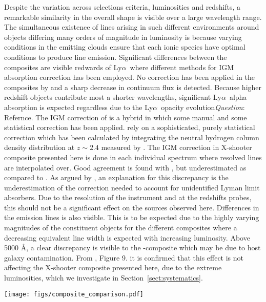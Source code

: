 \documentclass{aa}    %
\newcommand{\figlabel}[1]{\label{fig:#1}}
\newcommand{\sectionname}{Section}
\newcommand{\Sect}[1]{\sectionname~\ref{sect:#1}}
\newcommand{\sect}[1]{\Sect{#1}}
\newcommand{\lya}{Ly$\alpha$}
\newcommand{\todo}[3]{{\color{#2}\emph{#1}: #3}}
\newcommand{\qtodo}[1]{\todo{Question}{red}{#1}}
\begin{document}
Despite the variation across selections criteria, luminosities and redshifts, a remarkable similarity in the overall shape is visible over a large wavelength range. The simultaneous existence of lines arising in such different environments around objects differing many orders of magnitude in luminosity is because varying conditions in the emitting clouds ensure that each ionic species have optimal conditions to produce line emission\citep{Baldwin1995}.  Significant differences between the composites are visible redwards of \lya~where different methods for IGM absorption correction has been employed. No correction has been applied in the composites by \citet{Francis1991, VandenBerk2001} and a sharp decrease in continuum flux is detected. Because higher redshift objects contribute most a shorter wavelengths, significant \lya~alpha absorption is expected regardless due to the \lya~opacity evolution\qtodo{Refernce}. The IGM correction of \citet{Telfer2002} is a hybrid in which some manual and some statistical correction has been applied. \citet{Lusso2015} rely on a sophisticated, purely statistical correction which has been calculated by integrating the neutral hydrogen column density distribution at $z \sim 2.4$ measured by \cite{Prochaska2014b}. The IGM correction in X-shooter composite presented here is done in each individual spectrum where resolved lines are interpolated over. Good agreement is found with \cite{Telfer2002}, but underestimated as compared to \cite{Lusso2015}. As argued by \cite{Lusso2015}, an explanation for this discrepancy is the underestimation of the correction needed to account for unidentified Lyman limit absorbers. Due to the resolution of the instrument and at the redshifts probes, this should not be a significant effect on the sources observed here. 
Differences in the emission lines is also visible. This is to be expected due to the highly varying magnitudes of the constituent objects for the different composites where a decreasing equivalent line width is expected with increasing luminosity\citep{Baldwin1977}. 
Above 5000 \AA, a clear discrepancy is visible to the \cite{VandenBerk2001}-composite which may be due to host galaxy contamination\citep{Glikman2006}. From \cite{Shen2011}, Figure 9. it is confirmed that this effect is not affecting the X-shooter composite presented here, due to the extreme luminosities, which we investigate in \sect{systematics}.
 \begin{figure*}[hbtp]
   \centering
   \texttt{[image: figs/composite\_comparison.pdf]}
   \caption[]{Comparison of different composites. The composites by \citet{Lusso2015, VandenBerk2001, Telfer2002, Francis1991} are normalized to the X-shooter composite at $\sim 1450$ \AA~and the composite by \citet{Glikman2006} is normalized to ours at $\sim 3850$ \AA. Significant differences is visible blueward of \lya~due to differing IGM correction methods. Above 5000 \AA~ significant host galaxy contamination is visible in the composite by \citet{VandenBerk2001}. Overplot in blue is a pure power law with slope $\alpha = -1.7$ and normalized at $\sim 1450$ \AA.}
  \figlabel{composite_comparison}
 \end{figure*}
\end{document}
